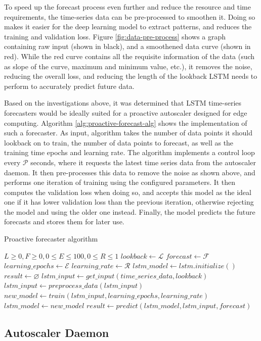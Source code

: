 To speed up the forecast process even further and reduce the resource and time requirements, the time-series data can be pre-processed to smoothen it. Doing so makes it easier for the deep learning model to extract patterns, and reduces the training and validation loss. Figure \ref{fig:data-pre-process} shows a graph containing raw input (shown in black), and a smoothened data curve (shown in red). While the red curve contains all the requisite information of the data (such as slope of the curve, maximum and minimum value, etc.), it removes the noise, reducing the overall loss, and reducing the length of the lookback LSTM needs to perform to accurately predict future data.\par

Based on the investigations above, it was determined that LSTM time-series forecasters would be ideally suited for a proactive autoscaler designed for edge computing. Algorithm \ref{alg:proactive-forecast-alg} shows the implementation of such a forecaster. As input, algorithm takes the number of data points it should lookback on to train, the number of data points to forecast, as well as the training time epochs and learning rate. The algorithm implements a control loop every $\mathcal{P}$ seconds, where it requests the latest time series data from the autoscaler daemon. It then pre-processes this data to remove the noise as shown above, and performs one iteration of training using the configured parameters. It then computes the validation loss when doing so, and accepts this model as the ideal one if it has lower validation loss than the previous iteration, otherwise rejecting the model and using the older one instead. Finally, the model predicts the future forecasts and stores them for later use.\par

\begin{algorithm}
    \caption{Proactive forecaster algorithm}
    \label{alg:proactive-forecast-alg}
    \begin{algorithmic}
        \Require $L \geq 0, F \geq 0, 0 \leq E \leq 100, 0 \leq R \leq 1$
        \State $lookback \gets \mathcal{L}$
        \State $forecast \gets \mathcal{F}$
        \State $learning\_epochs \gets \mathcal{E}$
        \State $learning\_rate \gets \mathcal{R}$
        \State $lstm\_model \gets lstm.initialize()$
        \State $result \gets \varnothing$
            \State $lstm\_input \gets get\_input(time\_series\_data, lookback)$
            \State $lstm\_input \gets preprocess\_data(lstm\_input)$
            \State $new\_model \gets train(lstm\_input, learning\_epochs, learning\_rate)$
                \State $lstm\_model \gets new\_model$
            \EndIf
            \State $result \gets predict(lstm\_model, lstm\_input, forecast)$
        \EndWhile
    \end{algorithmic}
\end{algorithm}

\subsection{Autoscaler Daemon}
\label{subsec:auto-daemon-subsection}

